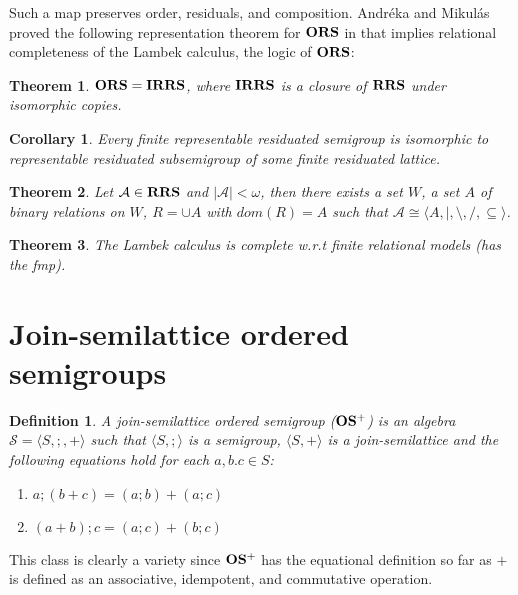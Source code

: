 \documentclass[a4paper]{article}
\theoremstyle{defin}
\newtheorem{defin}{Definition}
\theoremstyle{theorem}
\newtheorem{theorem}{Theorem}
\theoremstyle{prop}
\theoremstyle{lemma}
\theoremstyle{ex}
\theoremstyle{col}
\newtheorem{col}{Corollary}
\theoremstyle{claim}
\begin{document}
Such a map preserves order, residuals, and composition. Andr\'{e}ka and Mikul\'{a}s proved the following representation theorem for ${\bf ORS}$ in \cite{andreka1994lambek} that implies relational completeness of the Lambek calculus, the logic of ${\bf ORS}$:

\begin{theorem}\label{ors=irrs}
  ${\bf ORS} = {\bf IRRS}$, where ${\bf IRRS}$ is a closure of ${\bf RRS}$ under isomorphic copies.
\end{theorem}

\begin{col}
  Every finite representable residuated semigroup is isomorphic to representable residuated subsemigroup of some finite residuated lattice.
\end{col}

\begin{theorem}
  Let $\mathcal{A} \in {\bf RRS}$ and $|\mathcal{A}| < \omega$, then there exists a set $W$, a set $A$ of binary relations on $W$, $R = \cup A$ with $dom(R) = A$ such that
  $\mathcal{A} \cong \langle A, |, \setminus, /, \subseteq \rangle$.
\end{theorem}

\begin{theorem}
  The Lambek calculus is complete w.r.t finite relational models (has the fmp).
\end{theorem}


\section{Join-semilattice ordered semigroups}

\begin{defin} A join-semilattice ordered semigroup (${\bf OS^{+}}$) is an algebra $\mathcal{S} = \langle S, ;, + \rangle$ such that $\langle S, ; \rangle$ is a semigroup, $\langle S, + \rangle$ is a join-semilattice and the following equations hold for each $a, b. c \in S$:

  \begin{enumerate}
    \item $a ; (b + c) = (a ; b) + (a ; c)$
    \item $(a + b) ; c = (a ; c) + (b ; c)$
  \end{enumerate}
\end{defin}
This class is clearly a variety since ${\bf OS^{+}}$ has the equational definition so far as $+$ is defined as an associative, idempotent, and commutative operation.
\end{document}
